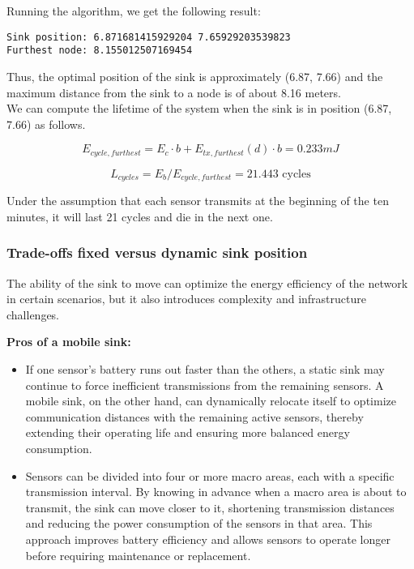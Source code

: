 Running the algorithm, we get the following result:
\begin{verbatim}
Sink position: 6.871681415929204 7.65929203539823
Furthest node: 8.155012507169454
\end{verbatim}

Thus, the optimal position of the sink is approximately (6.87, 7.66) and the maximum distance from the sink to a node is of about 8.16 meters.\\
We can compute the lifetime of the system when the sink is in position (6.87, 7.66) as follows.

\[
E_{cycle, furthest} = E_c \cdot b + E_{tx, furthest}(d) \cdot b = 0.233 mJ
\]

\[
L_{cycles} = E_b / E_{cycle, furthest} = 21.443 \text{ cycles}
\]

Under the assumption that each sensor transmits at the beginning of the ten minutes, it will last 21 cycles and die in the next one.

\subsubsection{Trade-offs fixed versus dynamic sink position}

The ability of the sink to move can optimize the energy efficiency of the network in certain scenarios, but it also introduces complexity and infrastructure challenges.

\textbf{Pros of a mobile sink:} 
\begin{itemize}

\item If one sensor's battery runs out faster than the others, a static sink may continue to force inefficient transmissions from the remaining sensors. A mobile sink, on the other hand, can dynamically relocate itself to optimize communication distances with the remaining active sensors, thereby extending their operating life and ensuring more balanced energy consumption.

\item Sensors can be divided into four or more macro areas, each with a specific transmission interval. By knowing in advance when a macro area is about to transmit, the sink can move closer to it, shortening transmission distances and reducing the power consumption of the sensors in that area. This approach improves battery efficiency and allows sensors to operate longer before requiring maintenance or replacement.
\end{itemize}

